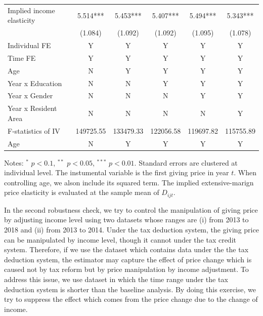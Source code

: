 \documentclass[
  11pt,
  a4paper,
]{article}
\begin{document}
\begin{table}
\begin{threeparttable}
\begin{tabular}[t]{lccccc}
  \hspace{1em}Implied income elasticity & 5.514*** & 5.453*** & 5.407*** & 5.494*** & 5.343***\\
  \hspace{1em} & (1.084) & (1.092) & (1.092) & (1.095) & (1.078)\\
  \hspace{1em}Individual FE & Y & Y & Y & Y & Y\\
  \hspace{1em}Time FE & Y & Y & Y & Y & Y\\
  \hspace{1em}Age & N & Y & Y & Y & \vphantom{1} Y\\
  \hspace{1em}Year x Education & N & N & Y & Y & Y\\
  \hspace{1em}Year x Gender & N & N & N & Y & Y\\
  \hspace{1em}Year x Resident Area & N & N & N & N & Y\\
  \hspace{1em}F-statistics of IV & 149725.55 & 133479.33 & 122056.58 & 119697.82 & 115755.89\\
  \hspace{1em}Age & N & Y & Y & Y & Y\\
  \bottomrule
  \end{tabular}
  \begin{tablenotes}
  \item Notes: $^{*}$ $p < 0.1$, $^{**}$ $p < 0.05$, $^{***}$ $p < 0.01$. Standard errors are clustered at individual level. The instumental variable is the first giving price in year $t$. When controlling age, we alson include its squared term. The implied extensive-marign price elasticity is evaluated at the sample mean of $D_{ijt}$.
  \end{tablenotes}
  \end{threeparttable}
  \end{table}

  In the second robustness check, we try to control the manipulation of giving price by adjusting income level using two datasets whose ranges are (i) from 2013 to 2018 and (ii) from 2013 to 2014. Under the tax deduction system, the giving price can be manipulated by income level, though it cannot under the tax credit system. Therefore, if we use the dataset which contains data under the the tax deduction system, the estimator may capture the effect of price change which is caused not by tax reform but by price manipulation by income adjustment. To address this issue, we use dataset in which the time range under the tax deduction system is shorter than the baseline analysis. By doing this exercise, we try to suppress the effect which comes from the price change due to the change of income.
\end{document}
